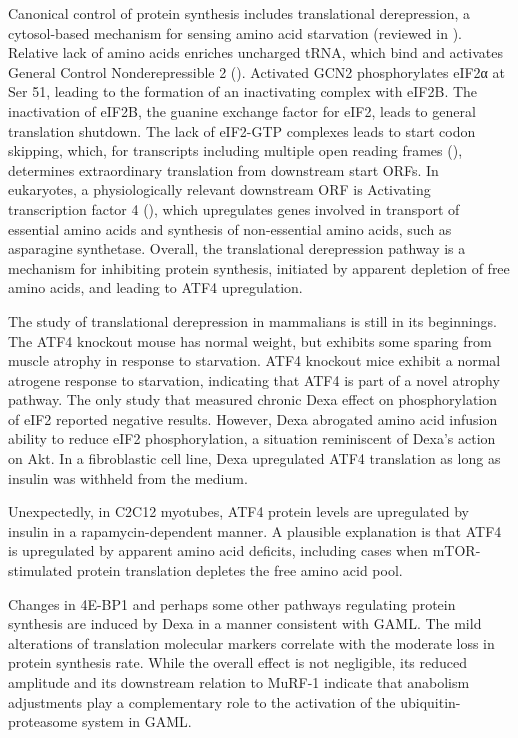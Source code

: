 \documentclass[12pt,english]{report}\usepackage[]{graphicx}\usepackage[]{color}
\begin{document}
Canonical control of protein synthesis includes translational derepression,
a cytosol-based mechanism for sensing amino acid starvation (reviewed
in \citep{gallinetti2013amino}). Relative lack of amino acids enriches
uncharged tRNA, which bind and activates General Control Nonderepressible
2 ()\citep{berlanga1999characterization}.
Activated GCN2 phosphorylates eIF2α at Ser 51, leading to the formation
of an inactivating complex with eIF2B\citep{gross1987evidence}. The
inactivation of eIF2B, the guanine exchange factor for eIF2, leads
to general translation shutdown\citep{sood2000mammalian}. The lack
of eIF2-GTP complexes leads to start codon skipping, which, for transcripts
including multiple open reading frames (),
determines extraordinary translation from downstream start ORFs. In
eukaryotes, a physiologically relevant downstream ORF is Activating
transcription factor 4 (),
which upregulates genes involved in transport of essential amino acids
and synthesis of non-essential amino acids, such as asparagine synthetase\citep{gjymishka2009transcriptional}.
Overall, the translational derepression pathway is a mechanism for
inhibiting protein synthesis, initiated by apparent depletion of free
amino acids, and leading to ATF4 upregulation.

The study of translational derepression in mammalians is still in
its beginnings. The ATF4 knockout mouse has normal weight, but exhibits
some sparing from muscle atrophy in response to starvation\citep{ebert2012stress-induced}.
ATF4 knockout mice exhibit a normal atrogene response to starvation,
indicating that ATF4 is part of a novel atrophy pathway. The only
study that measured chronic Dexa effect on phosphorylation of eIF2
reported negative results\citep{liu2004glucocorticoids}. However,
Dexa abrogated amino acid infusion ability to reduce eIF2 phosphorylation,
a situation reminiscent of Dexa's action on Akt. In a fibroblastic
cell line, Dexa upregulated ATF4 translation as long as insulin was
withheld from the medium\citep{adams2007role}.

Unexpectedly, in C2C12 myotubes, ATF4 protein levels are upregulated
by insulin in a rapamycin-dependent manner\citep{adams2007role}.
A plausible explanation is that ATF4 is upregulated by apparent amino
acid deficits, including cases when mTOR-stimulated protein translation
depletes the free amino acid pool.

Changes in 4E-BP1 and perhaps some other pathways regulating protein
synthesis are induced by Dexa in a manner consistent with GAML. The
mild alterations of translation molecular markers correlate with the
moderate loss in protein synthesis rate. While the overall effect
is not negligible, its reduced amplitude and its downstream relation
to MuRF-1 indicate that anabolism adjustments play a complementary
role to the activation of the ubiquitin-proteasome system in GAML.
\end{document}
